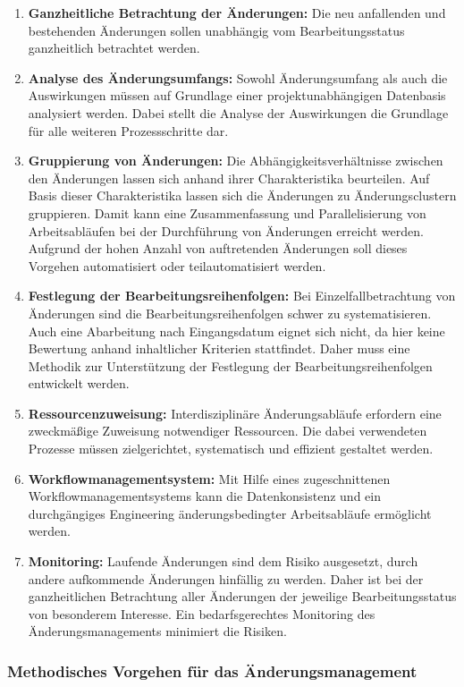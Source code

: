 \begin{enumerate}
 \item \textbf{Ganzheitliche Betrachtung der Änderungen: }
Die neu anfallenden und bestehenden Änderungen sollen unabhängig vom Bearbeitungsstatus ganzheitlich betrachtet werden.  
 \item \textbf{Analyse des Änderungsumfangs: }
 Sowohl Änderungsumfang als auch die Auswirkungen müssen auf Grundlage einer projektunabhängigen Datenbasis analysiert werden. Dabei stellt die Analyse der Auswirkungen die Grundlage für alle weiteren Prozessschritte dar. 
 \item \textbf{Gruppierung von Änderungen: }
  Die Abhängigkeitsverhältnisse zwischen den Änderungen lassen sich anhand ihrer Charakteristika beurteilen. Auf Basis dieser Charakteristika lassen sich die Änderungen zu Änderungsclustern gruppieren. Damit kann eine Zusammenfassung und Parallelisierung von Arbeitsabläufen bei der Durchführung von Änderungen erreicht werden. Aufgrund der hohen Anzahl von auftretenden Änderungen soll dieses Vorgehen automatisiert oder teilautomatisiert werden. 
 \item \textbf{Festlegung der Bearbeitungsreihenfolgen: }
 Bei Einzelfallbetrachtung von Änderungen sind die Bearbeitungsreihenfolgen schwer zu systematisieren. Auch eine Abarbeitung nach Eingangsdatum eignet sich nicht, da hier keine Bewertung anhand inhaltlicher Kriterien stattfindet. 
 Daher muss eine Methodik zur Unterstützung der Festlegung der Bearbeitungsreihenfolgen entwickelt werden. 
 \item \textbf{Ressourcenzuweisung: }
 Interdisziplinäre Änderungsabläufe erfordern eine zweckmäßige Zuweisung notwendiger Ressourcen. Die dabei verwendeten Prozesse müssen zielgerichtet, systematisch und effizient gestaltet werden. 
 \item \textbf{Workflowmanagementsystem: }
 Mit Hilfe eines zugeschnittenen Workflowmanagementsystems kann die Datenkonsistenz und ein durchgängiges Engineering änderungsbedingter Arbeitsabläufe ermöglicht werden. 
 \item \textbf{Monitoring: }
 Laufende Änderungen sind dem Risiko ausgesetzt, durch andere aufkommende Änderungen hinfällig zu werden. Daher ist bei der ganzheitlichen Betrachtung aller Änderungen der jeweilige Bearbeitungsstatus von besonderem Interesse. Ein bedarfsgerechtes Monitoring des Änderungsmanagements minimiert die Risiken. 
\end{enumerate}

\subsubsection*{Methodisches Vorgehen für das Änderungsmanagement}

